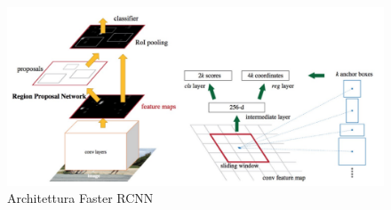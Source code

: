 \documentclass[12pt]{article}
\begin{document}
\begin{figure}[H]
    \centering
    \includegraphics[width=1.1\textwidth]{./img/faster-rcnn-two-stage.png}
    \caption{Architettura Faster RCNN}
    \label{fig:faster-rcnn}
\end{figure}
\end{document}
